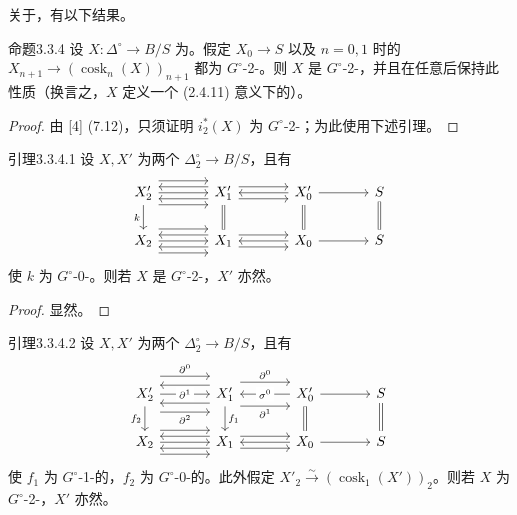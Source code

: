 关于，有以下结果。
\begin{SGAresult}{命题}{3.3.4}
设 $X:\Delta^\circ\to B/S$ 为。假定 $X_0\to S$ 以及 $n=0,1$ 时的 $X_{n+1}\to(\operatorname{cosk}_n(X))_{n+1}$ 都为 $G^\circ$-2-。则 $X$ 是 $G^\circ$-2-，并且在任意后保持此性质（换言之，$X$ 定义一个 (2.4.11) 意义下的）。
\end{SGAresult}
\begin{proof}
由 [4] (7.12)，只须证明 $i_2^*(X)$ 为 $G^\circ$-2-；为此使用下述引理。
\end{proof}
\begin{SGAresult}{引理}{3.3.4.1}
设 $X,X'$ 为两个 $\Delta_2^\circ\to B/S$，且有
\[
\begin{tikzcd}[column sep=large]
X'_2\arrow[r,shift left=2ex]\arrow[r]\arrow[r,shift right=2ex]\arrow[d,"k"']&X'_1\arrow[l,shift left=1ex]\arrow[l,shift right=1ex]\arrow[r,shift left=1ex]\arrow[r,shift right=1ex]\arrow[d,equal]&X'_0\arrow[l]\arrow[r]\arrow[d,equal]&S\arrow[d,equal]\\
X_2\arrow[r,shift left=2ex]\arrow[r]\arrow[r,shift right=2ex]&X_1\arrow[l,shift left=1ex]\arrow[l,shift right=1ex]\arrow[r,shift left=1ex]\arrow[r,shift right=1ex]&X_0\arrow[l]\arrow[r]&S
\end{tikzcd}
\]
使 $k$ 为 $G^\circ$-0-。则若 $X$ 是 $G^\circ$-2-，$X'$ 亦然。
\end{SGAresult}
\begin{proof}显然。\end{proof}
\begin{SGAresult}{引理}{3.3.4.2}
设 $X,X'$ 为两个 $\Delta_2^\circ\to B/S$，且有
\[
\begin{tikzcd}[column sep=large]
X'_2\arrow[r,shift left=3ex,"\partial^0"]\arrow[r,"\partial^1" description]\arrow[r,shift right=3ex,"\partial^2"']\arrow[d,"f_2"']&X'_1\arrow[l,shift left=1.5ex]\arrow[l,shift right=1.5ex]\arrow[r,shift left=2ex,"\partial^0"]\arrow[r,shift right=2ex,"\partial^1"']\arrow[d,"f_1"]&X'_0\arrow[l,"\sigma^0" description]\arrow[r]\arrow[d,equal]&S\arrow[d,equal]\\
X_2\arrow[r,shift left=2ex]\arrow[r]\arrow[r,shift right=2ex]&X_1\arrow[l,shift left=1ex]\arrow[l,shift right=1ex]\arrow[r,shift left=1ex]\arrow[r,shift right=1ex]&X_0\arrow[l]\arrow[r]&S
\end{tikzcd}
\]
使 $f_1$ 为 $G^\circ$-1-的，$f_2$ 为 $G^\circ$-0-的。此外假定 $X'_2\xrightarrow{\sim}(\operatorname{cosk}_1(X'))_2$。则若 $X$ 为 $G^\circ$-2-，$X'$ 亦然。
\end{SGAresult}
